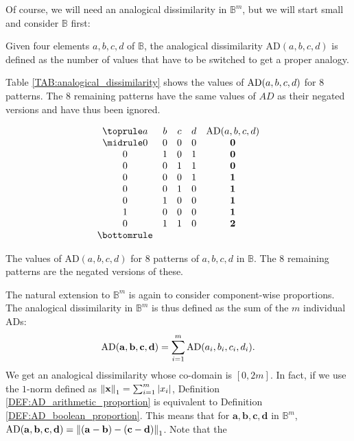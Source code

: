 Of course, we will need an analogical dissimilarity in $\mathbb{B}^m$, but we
will start small and consider $\mathbb{B}$ first:
\begin{definition}
  \label{DEF:AD_boolean_proportion}
  Given four elements $a, b, c, d$ of $\mathbb{B}$, the analogical
  dissimilarity $\text{AD}(a, b, c, d)$ is defined as the number of values that
  have to be switched to get a proper analogy.
\end{definition}
\noindent
Table \ref{TAB:analogical_dissimilarity} shows the values of $\AD(a, b, c, d)$
for 8 patterns. The $8$ remaining patterns have the same values of $AD$ as
their negated versions and have thus been ignored.
\begin{table}[t]
  \centering
  $$
  \begin{array}{ccccc}
    \toprule
    a & b & c & d &  \AD(a, b, c, d)\\
    \midrule
    0 & 0 & 0 & 0 &   \textbf{0}\\
    0 & 1 & 0 & 1 &   \textbf{0}\\
    0 & 0 & 1 & 1 &   \textbf{0}\\
    0 & 0 & 0 & 1 &   \textbf{1}\\
    0 & 0 & 1 & 0 &   \textbf{1}\\
    0 & 1 & 0 & 0 &   \textbf{1}\\
    1 & 0 & 0 & 0 &   \textbf{1}\\
    0 & 1 & 1 & 0 &   \textbf{2}\\
    \bottomrule
  \end{array}
  $$
  \caption{The values of $\text{AD}(a, b, c,d)$ for $8$ patterns of $a, b, c,
  d$ in $\mathbb{B}$. The $8$ remaining patterns are the negated versions of
  these.}
  \label{TAB:analogical_dissimilarity}
\end{table}
The natural extension to $\mathbb{B}^m$ is again to consider component-wise
proportions. The analogical dissimilarity in $\mathbb{B}^m$ is thus defined as
the sum of the $m$ individual ADs:
$$\AD(\mathbf{a}, \mathbf{b},\mathbf{c},\mathbf{d}) = \sum\limits_{i=1}^m
\AD(a_i,b_i,c_i,d_i).$$
We get an analogical dissimilarity whose co-domain is $[0, 2m]$. In fact, if we
use the $1$-norm defined as $\norm{1}{\mathbf{x}} = \sum_{i = 1}^m |x_i|$,
Definition \ref{DEF:AD_arithmetic_proportion} is equivalent to Definition
\ref{DEF:AD_boolean_proportion}. This means that for $\mathbf{a},
\mathbf{b},\mathbf{c},\mathbf{d}$ in $\mathbb{B}^m$, $\AD(\mathbf{a},
\mathbf{b},\mathbf{c},\mathbf{d}) =
\norm{1}{(\mathbf{a}-\mathbf{b})-(\mathbf{c}-\mathbf{d})}$. Note that the
